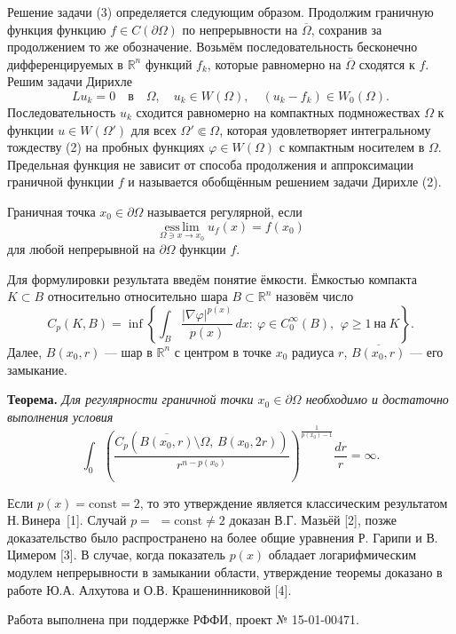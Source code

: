 Решение задачи (3) определяется следующим образом. Продолжим граничную функция функцию $f\in C(\partial \Omega)$ по непрерывности на $\overline{\Omega}$, сохранив за продолжением то же обозначение. Возьмём последовательность бесконечно дифференцируемых в $\mathbb{R}^n$ функций $f_k$, которые равномерно на $\overline{\Omega}$ сходятся к $f$. Решим задачи Дирихле
$$
Lu_k=0 \quad\text{в}\quad \Omega, \quad u_k \in W(\Omega), \quad (u_k-f_k)\in W_0(\Omega).
$$
Последовательность $u_k$ сходится равномерно  на компактных подмножествах $\Omega$ к функции $u\in W(\Omega')$ для всех $\Omega'\Subset \Omega$, которая удовлетворяет интегральному тождеству (2) на пробных функциях $\varphi \in W(\Omega)$ с компактным носителем в $\Omega$. Предельная функция не зависит от способа продолжения и аппроксимации граничной функции $f$ и называется обобщённым решением задачи Дирихле (2).

Граничная точка $x_0\in \partial \Omega$ называется регулярной, если
$$
\mathop{\mathrm{ess\,lim}}\limits_{\Omega \ni x\to x_0} u_f(x)= f(x_0)
$$
для любой непрерывной на $\partial \Omega$ функции $f$.

Для формулировки результата введём понятие ёмкости. Ёмкостью компакта $K\subset B$ относительно относительно шара $B\subset \mathbb{R}^n$ назовём число
$$
C_p (K, B)=\inf \left\{ \int_B \frac{|\nabla \varphi|^{p(x)}}{p(x)}\,dx:\ \varphi\in C_0^\infty(B),\ \,\varphi\geqslant 1\ \text{на}\ K \right\}.
$$
Далее, $B(x_0,r)$ --- шар в $\mathbb{R}^n$ с центром в точке $x_0$ радиуса $r$, $\overline{B(x_0,r)}$ --- его замыкание.

{\bf Теорема.} {\it Для регулярности граничной точки $x_0\in \partial \Omega$ необходимо и достаточно выполнения условия
$$
\int_0 \left( \frac{C_p \left(\overline{B(x_0,r)}\setminus \Omega,\, B(x_0,2r) \right)}{r^{n-p(x_0)}} \right)^\frac{1}{p(x_0)-1}\frac{dr}{r}=\infty.
$$
}

Если $p(x)=\mathrm{const}=2$, то это утверждение является классическим результатом Н.\,Винера~[1].
Случай
$p=$
\linebreak
$= \mathrm{const}\neq2$ доказан В.Г. Мазьёй [2], позже доказательство было распространено на более общие уравнения Р. Гарипи и В. Цимером [3]. В случае, когда показатель $p(x)$ обладает логарифмическим модулем непрерывности в замыкании области, утверждение теоремы  доказано в работе Ю.А. Алхутова и О.В. Крашенинниковой [4].

Работа выполнена при поддержке РФФИ, проект № 15-01-00471. %

